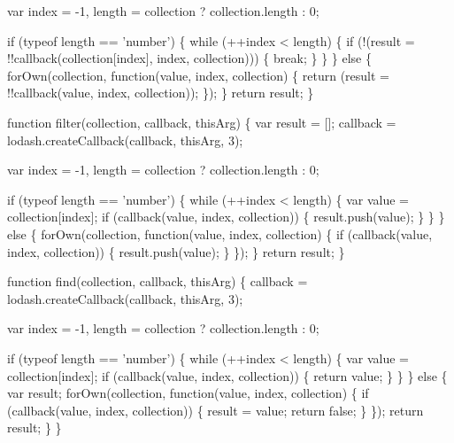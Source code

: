 \begin{DoxyCodeInclude}
      var index = -1,
          length = collection ? collection.length : 0;

      \textcolor{keywordflow}{if} (typeof length == \textcolor{stringliteral}{'number'}) \{
        \textcolor{keywordflow}{while} (++index < length) \{
          \textcolor{keywordflow}{if} (!(result = !!callback(collection[index], index, collection))) \{
            \textcolor{keywordflow}{break};
          \}
        \}
      \} \textcolor{keywordflow}{else} \{
        forOwn(collection, \textcolor{keyword}{function}(value, index, collection) \{
          \textcolor{keywordflow}{return} (result = !!callback(value, index, collection));
        \});
      \}
      \textcolor{keywordflow}{return} result;
    \}

    \textcolor{keyword}{function} filter(collection, callback, thisArg) \{
      var result = [];
      callback = lodash.createCallback(callback, thisArg, 3);

      var index = -1,
          length = collection ? collection.length : 0;

      \textcolor{keywordflow}{if} (typeof length == \textcolor{stringliteral}{'number'}) \{
        \textcolor{keywordflow}{while} (++index < length) \{
          var value = collection[index];
          \textcolor{keywordflow}{if} (callback(value, index, collection)) \{
            result.push(value);
          \}
        \}
      \} \textcolor{keywordflow}{else} \{
        forOwn(collection, \textcolor{keyword}{function}(value, index, collection) \{
          \textcolor{keywordflow}{if} (callback(value, index, collection)) \{
            result.push(value);
          \}
        \});
      \}
      \textcolor{keywordflow}{return} result;
    \}

    \textcolor{keyword}{function} find(collection, callback, thisArg) \{
      callback = lodash.createCallback(callback, thisArg, 3);

      var index = -1,
          length = collection ? collection.length : 0;

      \textcolor{keywordflow}{if} (typeof length == \textcolor{stringliteral}{'number'}) \{
        \textcolor{keywordflow}{while} (++index < length) \{
          var value = collection[index];
          \textcolor{keywordflow}{if} (callback(value, index, collection)) \{
            \textcolor{keywordflow}{return} value;
          \}
        \}
      \} \textcolor{keywordflow}{else} \{
        var result;
        forOwn(collection, \textcolor{keyword}{function}(value, index, collection) \{
          \textcolor{keywordflow}{if} (callback(value, index, collection)) \{
            result = value;
            \textcolor{keywordflow}{return} \textcolor{keyword}{false};
          \}
        \});
        \textcolor{keywordflow}{return} result;
      \}
    \}


\end{DoxyCodeInclude}
